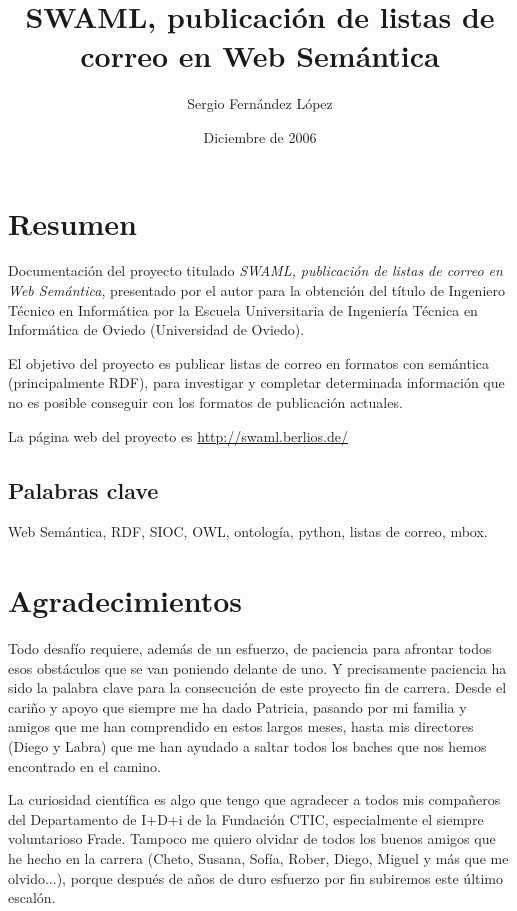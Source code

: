 \documentclass[spanish,a4paper,12pt,twosides]{book}
\title{SWAML, publicaci\'on de listas de correo en Web Sem\'antica}
\author{Sergio Fern\'andez L\'opez}
\date{Diciembre de 2006}
\begin{document}
\frontmatter

\maketitle



\chapter*{Resumen}

Documentación del proyecto titulado
\emph{SWAML, publicación de listas de correo en Web Semántica}, 
presentado por el autor para la obtención del título de Ingeniero 
Técnico en Informática por la Escuela Universitaria de Ingeniería 
Técnica en Informática de Oviedo (Universidad de Oviedo).

El objetivo del proyecto es publicar listas de correo en formatos
con semántica (principalmente RDF), para investigar y completar
determinada información que no es posible conseguir con los formatos
de publicación actuales.

La página web del proyecto es \url{http://swaml.berlios.de/}

\section*{Palabras clave}

Web Semántica, RDF, SIOC, OWL, ontología, python, listas de correo, mbox.

\chapter*{Agradecimientos}

Todo desafío requiere, además de un esfuerzo, de paciencia para afrontar
todos esos obstáculos que se van poniendo delante de uno. Y precisamente
paciencia ha sido la palabra clave para la consecución de este proyecto
fin de carrera. Desde el cariño y apoyo que siempre me ha dado Patricia,
pasando por mi familia y amigos que me han comprendido en estos largos 
meses, hasta mis directores (Diego y Labra) que me han ayudado a saltar
todos los baches que nos hemos encontrado en el camino.

La curiosidad científica es algo que tengo que agradecer a todos mis
compañeros del Departamento de I+D+i de la Fundación CTIC, especialmente
el siempre voluntarioso Frade. Tampoco me quiero olvidar de todos los 
buenos amigos que he hecho en la carrera (Cheto, Susana, Sofía, Rober, 
Diego, Miguel y más que me olvido...), porque después de años de duro 
esfuerzo por fin subiremos este último escalón.
\end{document}
